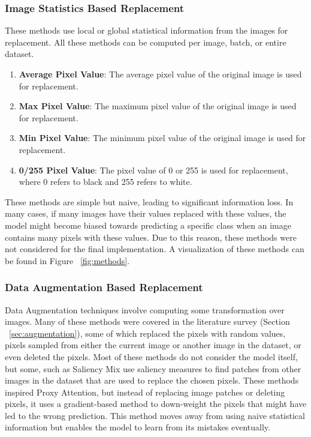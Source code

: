 \subsubsection{Image Statistics Based Replacement}
These methods use local or global statistical information from the images for replacement. All these methods can be computed per image, batch, or entire dataset.

\begin{enumerate}
    \item \textbf{Average Pixel Value}: The average pixel value of the original image is used for replacement.
    \item \textbf{Max Pixel Value}: The maximum pixel value of the original image is used for replacement.
    \item \textbf{Min Pixel Value}: The minimum pixel value of the original image is used for replacement.
    \item \textbf{0/255 Pixel Value}: The pixel value of 0 or 255 is used for replacement, where 0 refers to black and 255 refers to white.
\end{enumerate}
These methods are simple but naive, leading to significant information loss. In many cases, if many images have their values replaced with these values, the model might become biased towards predicting a specific class when an image contains many pixels with these values.
Due to this reason, these methods were not considered for the final implementation. A visualization of these methods can be found in Figure ~\ref{fig:methods}.

\subsubsection{Data Augmentation Based Replacement}
Data Augmentation techniques involve computing some transformation over images. Many of these methods were covered in the literature survey (Section ~\ref{sec:augmentation}), some of which replaced the pixels with random values, pixels sampled from either the current image or another image in the dataset, or even deleted the pixels. Most of these methods do not consider the model itself, but some, such as Saliency Mix \cite{uddinSaliencyMixSaliencyGuided2021} use saliency measures to find patches from other images in the dataset that are used to replace the chosen pixels.
These methods inspired Proxy Attention, but instead of replacing image patches or deleting pixels, it uses a gradient-based method to down-weight the pixels that might have led to the wrong prediction. This method moves away from using naive statistical information but enables the model to learn from its mistakes eventually.

